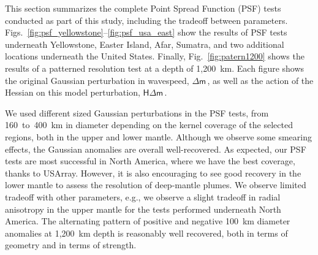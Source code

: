 \documentclass[extra,mreferee]{gji}
\begin{document}
This section summarizes the complete Point Spread Function (PSF) tests conducted as part of this study, including the tradeoff between parameters.
Figs.~\ref{fig:psf_yellowstone}--\ref{fig:psf_usa_east} show the results of PSF tests underneath Yellowstone, Easter Island, Afar, Sumatra, and two additional locations underneath the United States.
Finally, Fig.~\ref{fig:patern1200} shows the results of a patterned resolution test at a depth of 1,200~km.
Each figure shows the original Gaussian perturbation in wavespeed, $\mathsf{\Delta}\mathsf{m}$\,, as well as the action of the Hessian on this model perturbation, $\mathsf{H}\mathsf{\Delta}\mathsf{m}$\,.

We used different sized Gaussian perturbations in the PSF tests, from 160~to~400~km in diameter depending on the kernel coverage of the selected regions, both in the upper and lower mantle.
Although we observe some smearing effects, the Gaussian anomalies are overall well-recovered.
As expected, our PSF tests are most successful in North America, where we have the best coverage, thanks to USArray.
However, it is also encouraging to see good recovery in the lower mantle to assess the resolution of deep-mantle plumes.
We observe limited tradeoff with other parameters, e.g., we observe a slight tradeoff in radial anisotropy in the upper mantle for the tests performed underneath North America.
The alternating pattern of positive and negative 100~km diameter anomalies at 1,200~km depth is reasonably well recovered, both in terms of geometry and in terms of strength.
\end{document}
